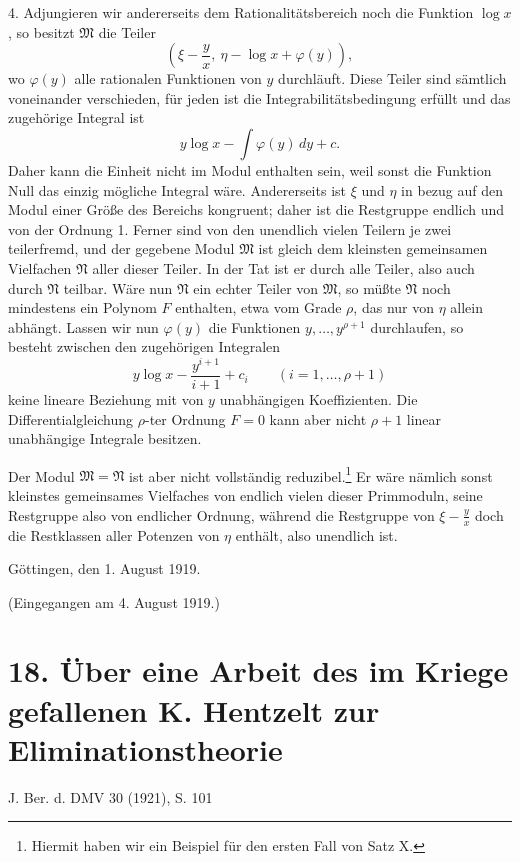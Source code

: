 \documentclass[11pt]{article}
\begin{document}
4. Adjungieren wir andererseits dem Rationalitätsbereich noch die Funktion $\log x$, so besitzt $\mathfrak M$ die Teiler
\[
 \left(\xi-\frac{y}{x},\ \eta-\log x+\varphi(y)\right),
\]
wo $\varphi(y)$ alle rationalen Funktionen von $y$ durchläuft. Diese Teiler sind sämtlich voneinander verschieden, für jeden ist die Integrabilitätsbedingung erfüllt und das zugehörige Integral ist
\[
 y\log x-\int\varphi(y)\,dy+c.
\]
Daher kann die Einheit nicht im Modul enthalten sein, weil sonst die Funktion Null das einzig mögliche Integral wäre. Andererseits ist $\xi$ und $\eta$ in bezug auf den Modul einer Größe des Bereichs kongruent; daher ist die Restgruppe endlich und von der Ordnung 1. Ferner sind von den unendlich vielen Teilern je zwei teilerfremd, und der gegebene Modul $\mathfrak M$ ist gleich dem kleinsten gemeinsamen Vielfachen $\mathfrak N$ aller dieser Teiler. In der Tat ist er durch alle Teiler, also auch durch $\mathfrak N$ teilbar. Wäre nun $\mathfrak N$ ein echter Teiler von $\mathfrak M$, so müßte $\mathfrak N$ noch mindestens ein Polynom $F$ enthalten, etwa vom Grade $\rho$, das nur von $\eta$ allein abhängt. Lassen wir nun $\varphi(y)$ die Funktionen $y,
\ldots,y^{\rho+1}$ durchlaufen, so besteht zwischen den zugehörigen Integralen
\[
 y\log x-\frac{y^{i+1}}{i+1}+c_i\qquad(i=1,
\ldots,
\rho+1)
\]
keine lineare Beziehung mit von $y$ unabhängigen Koeffizienten. Die Differentialgleichung $\rho$-ter Ordnung $F=0$ kann aber nicht $\rho+1$ linear unabhängige Integrale besitzen.

Der Modul $\mathfrak M=\mathfrak N$ ist aber nicht vollständig reduzibel.\footnote{Hiermit haben wir ein Beispiel für den ersten Fall von Satz X.} Er wäre nämlich sonst kleinstes gemeinsames Vielfaches von endlich vielen dieser Primmoduln, seine Restgruppe also von endlicher Ordnung, während die Restgruppe von $\xi-\frac{y}{x}$ doch die Restklassen aller Potenzen von $\eta$ enthält, also unendlich ist.

Göttingen, den 1. August 1919.

\begin{center}
(Eingegangen am 4. August 1919.)
\end{center}

\clearpage
\setcounter{footnote}{0}
\section*{18. Über eine Arbeit des im Kriege gefallenen K. Hentzelt zur Eliminationstheorie}
\begin{center}
J. Ber. d. DMV 30 (1921), S. 101
\end{center}
\end{document}
